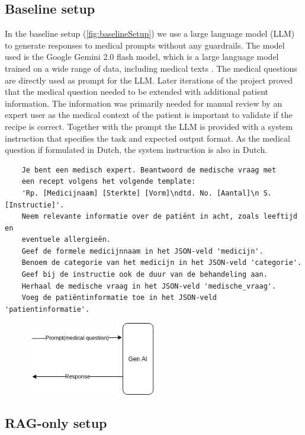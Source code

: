 \subsection{Baseline setup}
In the baseline setup (\autoref{fig:baselineSetup}) we use a large language model (LLM) to generate responses to medical prompts without any guardrails.
The model used is the Google Gemini 2.0 flash model, which is a large language model trained on a wide range of data, including medical texts \citep{saab2024capabilities}.
The medical questions are directly used as prompt for the LLM.
Later iterations of the project proved that the medical question needed to be extended with additional patient information.
The information was primarily needed for manual review by an expert user as the medical context of the patient is important to validate if the recipe is correct.
Together with the prompt the LLM is provided with a system instruction that specifies the task and expected output format.
As the medical question if formulated in Dutch, the system instruction is also in Dutch.
\begin{verbatim}
    Je bent een medisch expert. Beantwoord de medische vraag met
    een recept volgens het volgende template:
    'Rp. [Medicijnaam] [Sterkte] [Vorm]\ndtd. No. [Aantal]\n S. [Instructie]'.
    Neem relevante informatie over de patiënt in acht, zoals leeftijd en
    eventuele allergieën.
    Geef de formele medicijnnaam in het JSON-veld 'medicijn'.
    Benoem de categorie van het medicijn in het JSON-veld 'categorie'.
    Geef bij de instructie ook de duur van de behandeling aan.
    Herhaal de medische vraag in het JSON-veld 'medische_vraag'.
    Voeg de patiëntinformatie toe in het JSON-veld 'patientinformatie'.
\end{verbatim}

\begin{figure}[H]
    \includegraphics[width=0.5\textwidth]{figures/baselineSetup.png}
    \label{fig:baselineSetup}
\end{figure}

\subsection{RAG-only setup}

